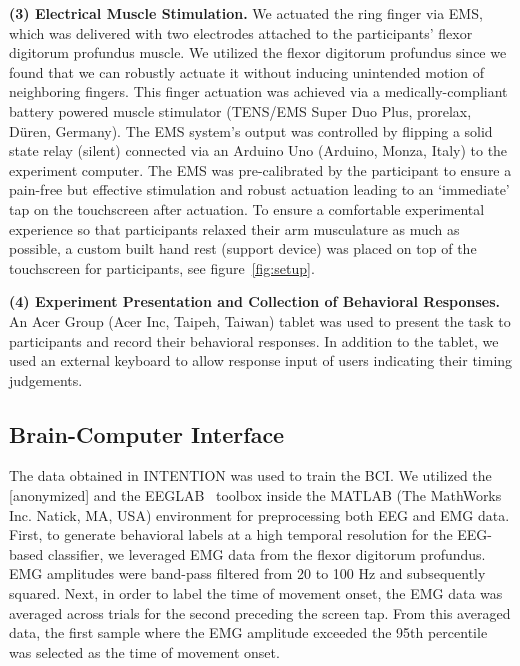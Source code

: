 \indent\textbf{(3) Electrical Muscle Stimulation.} We actuated the ring finger via EMS, which was delivered with two electrodes attached to the participants' flexor digitorum profundus muscle. We utilized the flexor digitorum profundus since we found that we can robustly actuate it without inducing unintended motion of neighboring fingers. This finger actuation was achieved via a medically-compliant battery powered muscle stimulator (TENS/EMS Super Duo Plus, prorelax, Düren, Germany). The EMS system's output was controlled by flipping a solid state relay (silent) connected via an Arduino Uno (Arduino, Monza, Italy) to the experiment computer. The EMS was pre-calibrated by the participant to ensure a pain-free but effective stimulation and robust actuation leading to an `immediate' tap on the touchscreen after actuation. To ensure a comfortable experimental experience so that participants relaxed their arm musculature as much as possible, a custom built hand rest (support device) was placed on top of the touchscreen for participants, see figure~\ref{fig:setup}.

\indent\textbf{(4) Experiment Presentation and Collection of Behavioral Responses.} An Acer Group (Acer Inc, Taipeh, Taiwan) tablet was used to present the task to participants and record their behavioral responses. In addition to the tablet, we used an external keyboard to allow response input of users indicating their timing judgements.

\subsection{Brain-Computer Interface}\label{BCI}
The data obtained in INTENTION was used to train the BCI. We utilized the [anonymized] and the EEGLAB~\cite{Delorme2004-sn} toolbox inside the MATLAB (The MathWorks Inc. Natick, MA, USA) environment for preprocessing both EEG and EMG data. First, to generate behavioral labels at a high temporal resolution for the EEG-based classifier, we leveraged EMG data from the flexor digitorum profundus. EMG amplitudes were band-pass filtered from 20 to 100 Hz and subsequently squared. Next, in order to label the time of movement onset, the EMG data was averaged across trials for the second preceding the screen tap. From this averaged data, the first sample where the EMG amplitude exceeded the 95th percentile was selected as the time of movement onset.

